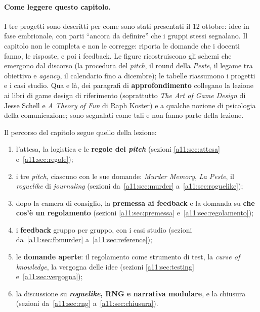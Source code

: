 \paragraph{Come leggere questo capitolo.} I tre progetti sono descritti per come sono
stati presentati il 12 ottobre: idee in fase embrionale, con parti ``ancora da
definire'' che i gruppi stessi segnalano. Il capitolo non le completa e non le corregge:
riporta le domande che i docenti fanno, le risposte, e poi i feedback. Le figure
ricostruiscono gli schemi che emergono dal discorso (la procedura del \emph{pitch}, il
round della \emph{Peste}, il legame tra obiettivo e \emph{agency}, il calendario fino a
dicembre); le tabelle riassumono i progetti e i casi studio. Qua e là, dei paragrafi di
\textbf{approfondimento} collegano la lezione ai libri di game design di riferimento
(soprattutto \emph{The Art of Game Design} di Jesse Schell e \emph{A Theory of Fun} di
Raph Koster) e a qualche nozione di psicologia della comunicazione; sono segnalati come
tali e non fanno parte della lezione.

Il percorso del capitolo segue quello della lezione:
\begin{enumerate}
  \item l'attesa, la logistica e le \textbf{regole del \emph{pitch}} (sezioni
        \ref{a11:sec:attesa} e~\ref{a11:sec:regole});
  \item i tre \emph{pitch}, ciascuno con le sue domande: \emph{Murder Memory},
        \emph{La Peste}, il \emph{roguelike} di \emph{journaling} (sezioni
        da~\ref{a11:sec:murder} a~\ref{a11:sec:roguelike});
  \item dopo la camera di consiglio, la \textbf{premessa ai feedback} e la domanda su
        \textbf{che cos'è un regolamento} (sezioni \ref{a11:sec:premessa}
        e~\ref{a11:sec:regolamento});
  \item i \textbf{feedback} gruppo per gruppo, con i casi studio (sezioni
        da~\ref{a11:sec:fbmurder} a~\ref{a11:sec:reference});
  \item le \textbf{domande aperte}: il regolamento come strumento di test, la
        \emph{curse of knowledge}, la vergogna delle idee (sezioni
        \ref{a11:sec:testing} e~\ref{a11:sec:vergogna});
  \item la discussione su \textbf{\emph{roguelike}, RNG e narrativa modulare}, e la
        chiusura (sezioni da~\ref{a11:sec:rng} a~\ref{a11:sec:chiusura}).
\end{enumerate}

